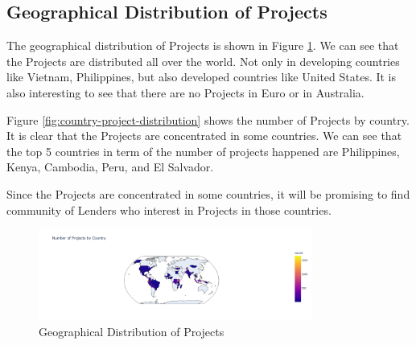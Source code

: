 \subsection{Geographical Distribution of Projects}

The geographical distribution of Projects is shown in Figure \ref{fig:map-number-project-by-country}.
We can see that the Projects are distributed all over the world.
Not only in developing countries like Vietnam, Philippines,
but also developed countries like United States.
It is also interesting to see that there are no Projects in Euro or in Australia.

Figure \ref{fig:country-project-distribution} shows the number of Projects by country.
It is clear that the Projects are concentrated in some countries.
We can see that the top 5 countries in term of the number of projects happened are Philippines, Kenya, Cambodia, Peru, and El Salvador.

Since the Projects are concentrated in some countries,
it will be promising to find community of Lenders who interest in Projects in those countries.

\begin{figure}[H]
	\centering
	\includegraphics[width=0.8\textwidth]{images/map-number-project-by-country.png}
	\caption{Geographical Distribution of Projects}
	\label{fig:map-number-project-by-country}
\end{figure}


